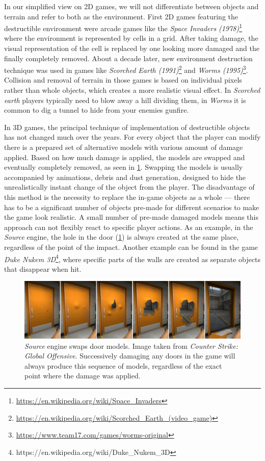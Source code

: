 In our simplified view on 2D games, we will not differentiate between objects and terrain and refer to both as the environment.
First 2D games featuring the destructible environment were arcade games like the \emph{Space Invaders (1978)}\footnote{\url{https://en.wikipedia.org/wiki/Space\_Invaders}} where the environment is represented by cells in a grid. After taking damage, the visual representation of the cell is replaced by one looking more damaged and the finally completely removed. About a decade later, new environment destruction technique was used in games like \emph{Scorched Earth (1991)}\footnote{\url{https://en.wikipedia.org/wiki/Scorched\_Earth\_(video\_game)}} and \emph{Worms (1995)}\footnote{\url{https://www.team17.com/games/worms-original}}. Collision and removal of terrain in those games is based on individual pixels rather than whole objects, which creates a more realistic visual effect. In \emph{Scorched earth} players typically need to blow away a hill dividing them, in \emph{Worms} it is common to dig a tunnel to hide from your enemies gunfire.

In 3D games, the principal technique of implementation of destructible objects has not changed much over the years. For every object that the player can modify there is a prepared set of alternative models with various amount of damage applied. Based on how much damage is applied, the models are swapped and eventually completely removed, as seen in \cref{fig:doors}. Swapping the models is usually accompanied by animations, debris and dust generation, designed to hide the unrealistically instant change of the object from the player. The disadvantage of this method is the necessity to replace the in-game objects as a whole --- there has to be a significant number of objects pre-made for different scenarios to make the game look realistic. A small number of pre-made damaged models means this approach can not flexibly react to specific player actions. As an example, in the \emph{Source} engine, the hole in the door (\cref{fig:doors}) is always created at the same place, regardless of the point of the impact. Another example can be found in the game \emph{Duke Nukem 3D}\footnote{https://en.wikipedia.org/wiki/Duke\_Nukem\_3D}, where specific parts of the walls are created as separate objects that disappear when hit.

\begin{figure} 
\centering
\includegraphics[width=\textwidth]{img/doors}
\caption{\emph{Source} engine swaps door models. Image taken from \emph{Counter Strike: Global Offensive}. Successively damaging any doors in the game will always produce this sequence of models, regardless of the exact point where the damage was applied.}
\label{fig:doors}
\end{figure}

